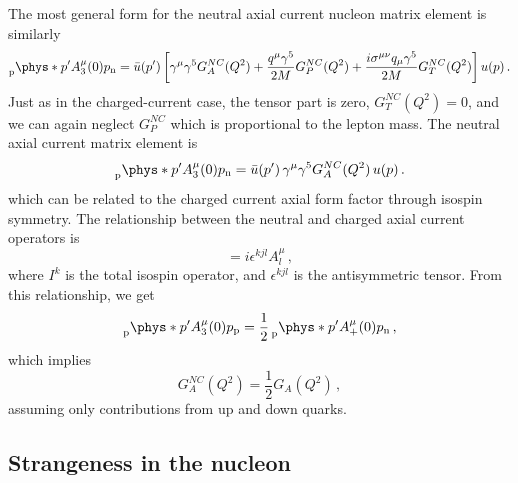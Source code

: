     The most general form for the neutral axial current nucleon matrix element
    is similarly
    \begin{equation}
      \prescript{}{\textrm{p}}{\phys*{p'}{A^{\mu}_3(0)}{p}}_{\textrm{n}} 
        = \bar{u}(p') \left[\gamma^{\mu}\gamma^{5} G_A^{NC}(Q^2) 
          + \frac{q^{\mu}\gamma^{5}}{2M}G_P^{NC}(Q^2) 
          + \frac{i\sigma^{\mu\nu}q_{\mu}\gamma^{5}}{2M}G_T^{NC}(Q^2)\right] u(p) \,.
    \end{equation}
    Just as in the charged-current case, the tensor part is zero, $G_T^{NC}(Q^2) =
    0$, and we can again neglect $G_P^{NC}$ which is proportional to the lepton
    mass. The neutral axial current matrix element is
    \begin{equation}
      \prescript{}{\textrm{p}}{\phys*{p'}{A^{\mu}_3(0)}{p}}_{\textrm{n}} 
        = \bar{u}(p') \,\gamma^{\mu}\gamma^{5} G_A^{NC}(Q^2)\, u(p) \,.
    \end{equation}
    which can be related to the charged current axial form factor through
    isospin symmetry.  The relationship between the neutral and charged axial
    current operators is
    \begin{equation}
      [I^k,A_j^{\mu}] = i\epsilon^{kjl}A^{\mu}_l \,,
    \end{equation}
    where $I^k$ is the total isospin operator, and $\epsilon^{kjl}$ is the
    antisymmetric tensor. From this relationship, we get
    \begin{equation}
      \prescript{}{\textrm{p}}{\phys*{p'}{A^{\mu}_3(0)}{p}}_{\textrm{p}}
       = \frac{1}{2}\prescript{}{\textrm{p}}{\phys*{p'}{A^{\mu}_+(0)}{p}}_{\textrm{n}}\,,
    \end{equation}
    which implies
    \begin{equation}
      G_A^{NC}(Q^2) = \frac{1}{2}G_A(Q^2) \,,
    \end{equation}
    assuming only contributions from up and down quarks.

\subsection{Strangeness in the nucleon} \label{sec:strangeness}

